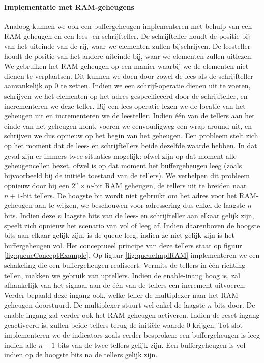 \paragraph{Implementatie met RAM-geheugens}
Analoog kunnen we ook een buffergeheugen implementeren met behulp van een RAM-geheugen en een lees- en schrijfteller. De schrijfteller houdt de positie bij van het uiteinde van de rij, waar we elementen zullen bijschrijven. De leesteller houdt de positie van het andere uiteinde bij, waar we elementen zullen uitlezen. We gebruiken het RAM-geheugen op een manier waarbij we de elementen niet dienen te verplaatsen. Dit kunnen we doen door zowel de lees als de schrijfteller aanvankelijk op 0 te zetten. Indien we een schrijf-operatie dienen uit te voeren, schrijven we het elementen op het adres gespecificeerd door de schrijfteller, en incrementeren we deze teller. Bij een lees-operatie lezen we de locatie van het geheugen uit en incrementeren we de leesteller. Indien \'e\'en van de tellers aan het einde van het geheugen komt, voeren we eenvoudigweg een wrap-around uit, en schrijven we dus opnieuw op het begin van het geheugen. Een probleem stelt zich op het moment dat de lees- en schrijftellers beide dezelfde
waarde hebben. In dat geval zijn er immers twee situaties mogelijk: ofwel zijn op dat moment alle geheugencellen bezet, ofwel is op dat moment het buffergeheugen leeg (zoals bijvoorbeeld bij de initi\"ele toestand van de tellers). We verhelpen dit probleem opnieuw door bij een $2^n\times w$-bit RAM geheugen, de tellers uit te breiden naar $n+1$-bit tellers. De hoogste bit wordt niet gebruikt om het adres voor het RAM-geheugen aan te wijzen, we beschouwen voor adressering dus enkel de laagste $n$ bits. Indien deze $n$ laagste bits van de lees- en schrijfteller aan elkaar gelijk zijn, speelt zich opnieuw het scenario van vol of leeg af. Indien daarenboven de hoogste bits aan elkaar gelijk zijn, is de queue leeg, indien ze niet gelijk zijn is het buffergeheugen vol. Het conceptueel principe van deze tellers staat op figuur \ref{fig:queueConceptExample}. Op figuur \ref{fig:queueImplRAM} implementeren we een schakeling die een buffergeheugen realiseert. Vermits de tellers in \'e\'en richting tellen, makken we
gebruik van uptellers. Indien de enable-inang hoog is, zal afhankelijk van het signaal aan de \mbox{} \'e\'en van de tellers een increment uitvoeren. Verder bepaald deze ingang ook, welke teller de multiplexer naar het RAM-geheugen doorstuurd. De multiplexer stuurt wel enkel de laagste $n$ bits door. De enable ingang zal verder ook het RAM-geheugen activeren. Indien de reset-ingang geactiveerd is, zullen beide tellers terug de initi\"ele waarde 0 krijgen. Tot slot implementeren we de indicators zoals eerder besproken: een buffergeheugen is leeg indien alle $n+1$ bits van de twee tellers gelijk zijn. Een buffergeheugen is vol indien op de hoogste bits na de tellers gelijk zijn.
